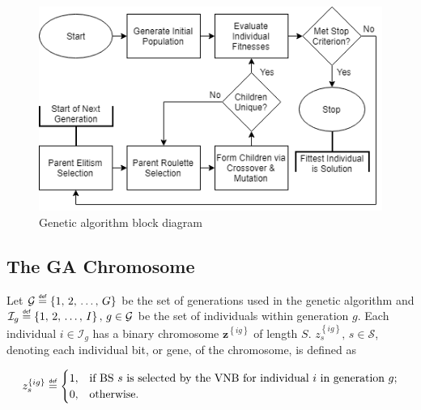 \documentclass[12pt,dvipsnames]{report}
\newif\ifisdoublespacing
\newcommand\defeq{\mathrel{\overset{\makebox[0pt]{\mbox{\normalfont\tiny\sffamily def}}}{=}}}
\begin{document}
\begin{figure}[ht]
	\centering
	\includegraphics[width=1\linewidth]{Genetic_Algorithm_Basic}
	\caption{Genetic algorithm block diagram}
	\label{fig:ga_block}
\end{figure}

\subsection{The GA Chromosome} \label{subsec:ga_chromosome}

Let $\mathcal{G} \defeq \left\{ 1,\, 2,\, \ldots,\, G \right\}$ be the set of generations used in the genetic algorithm and $\mathcal{I}_g \defeq \left\{ 1,\, 2,\, \ldots,\, I \right\},\, g \in \mathcal{G}$ be the set of individuals within generation $g$.  Each individual $i \in \mathcal{I}_g$ has a binary chromosome $\textbf{z}^{\left\{ ig \right\}}$ of length $S$.  $z_s^{\left\{ ig \right\}},\, s \in \mathcal{S}$, denoting each individual bit, or gene, of the chromosome, is defined as

\ifisdoublespacing
\begin{singlespacing}
\begin{equation}
z_s^{\left\{ ig \right\}} \defeq
	\begin{cases}
		1,& \text{if BS $s$ is selected by the VNB for individual $i$ in generation $g$;}\\
		\\
		0,& \text{otherwise.}
	\end{cases}
\end{equation}
\end{singlespacing}
\else
\begin{equation}
z_s^{\left\{ ig \right\}} \defeq
	\begin{cases}
		1,& \text{if BS $s$ is selected by the VNB for individual $i$ in generation $g$;}\\
		0,& \text{otherwise.}
	\end{cases}
\end{equation}
\fi
\end{document}
